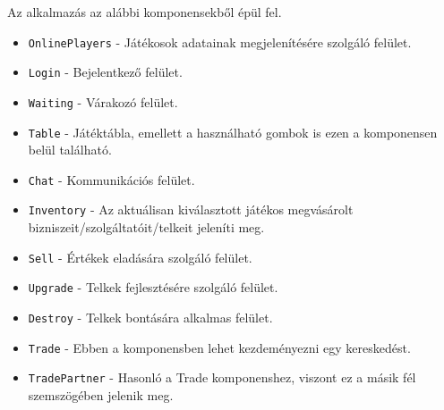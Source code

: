 
Az alkalmazás az alábbi komponensekből épül fel.

\begin{itemize}
	\item \texttt{OnlinePlayers} - Játékosok adatainak megjelenítésére szolgáló felület.
	\item \texttt{Login} - Bejelentkező felület.
	\item \texttt{Waiting} - Várakozó felület.
	\item \texttt{Table} - Játéktábla, emellett a használható gombok is ezen a komponensen belül található.
	\item \texttt{Chat} - Kommunikációs felület.
	\item \texttt{Inventory} - Az aktuálisan kiválasztott játékos megvásárolt bizniszeit/szolgáltatóit/telkeit jeleníti meg.
	\item \texttt{Sell} - Értékek eladására szolgáló felület.
	\item \texttt{Upgrade} - Telkek fejlesztésére szolgáló felület.
	\item \texttt{Destroy} - Telkek bontására alkalmas felület.
	\item \texttt{Trade} - Ebben a komponensben lehet kezdeményezni egy kereskedést.
	\item \texttt{TradePartner} - Hasonló a Trade komponenshez, viszont ez a másik fél szemszögében jelenik meg.
\end{itemize}
